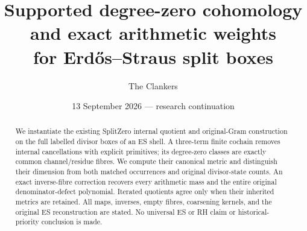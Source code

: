 \documentclass[11pt,a4paper]{article}
\title{Supported degree-zero cohomology and exact arithmetic weights\\for Erd\H{o}s--Straus split boxes}
\author{The Clankers}
\date{13 September 2026 --- research continuation}
\begin{document}
\maketitle
\begin{abstract}
We instantiate the existing SplitZero internal quotient and original-Gram
construction on the full labelled divisor boxes of an ES shell. A
three-term finite cochain removes internal cancellations with explicit
primitives; its degree-zero classes are exactly common channel/residue
fibres. We compute their canonical metric and distinguish their dimension
from both matched occurrences and original divisor-state counts. An exact
inverse-fibre correction recovers every arithmetic mass and the entire
original denominator-defect polynomial. Iterated quotients agree only
when their inherited metrics are retained. All maps, inverses, empty
fibres, coarsening kernels, and the original ES reconstruction are stated.
No universal ES or RH claim or historical-priority conclusion is made.
\end{abstract}


\end{document}
